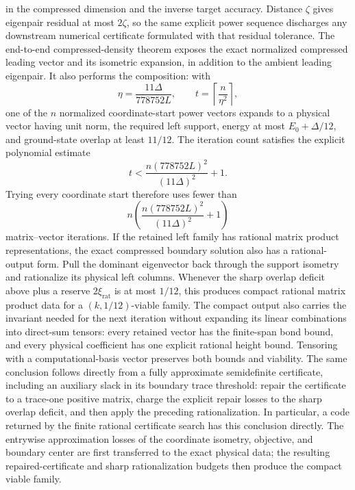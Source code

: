 \begin{lemma}
    in the compressed dimension and the inverse target accuracy.
    Distance \(\zeta\) gives eigenpair residual at most \(2\zeta\), so the
    same explicit power sequence discharges any downstream numerical
    certificate formulated with that residual tolerance.  The end-to-end
    compressed-density theorem exposes the exact normalized compressed
    leading vector and its isometric expansion, in addition to the ambient
    leading eigenpair.  It also performs the composition: with
    \[
        \eta=\frac{11\Delta}{778752L},\qquad
        t=\left\lceil\frac{n}{\eta^2}\right\rceil,
    \]
    one of the \(n\) normalized coordinate-start power vectors expands to a
    physical vector having unit norm, the required left support, energy at
    most \(E_0+\Delta/12\), and ground-state overlap at least \(11/12\).
    The iteration count satisfies the explicit polynomial estimate
    \[
        t<\frac{n(778752L)^2}{(11\Delta)^2}+1.
    \]
    Trying every coordinate start therefore uses fewer than
    \[
        n\left(\frac{n(778752L)^2}{(11\Delta)^2}+1\right)
    \]
    matrix--vector iterations.
    If the retained left family has rational matrix product representations,
    the exact compressed boundary solution also has a rational-output form.
    Pull the dominant eigenvector back through the support isometry and
    rationalize its physical left columns.  Whenever the sharp overlap
    deficit above plus a reserve \(2\xi_{\mathrm{rat}}\) is at most \(1/12\),
    this produces compact rational matrix product data for a
    \((k,1/12)\)-viable family.
    The compact output also carries the invariant needed for the next
    iteration without expanding its linear combinations into direct-sum
    tensors: every retained vector has the finite-span bond bound, and every
    physical coefficient has one explicit rational height bound.  Tensoring
    with a computational-basis vector preserves both bounds and viability.
    The same conclusion follows directly from a fully approximate
    semidefinite certificate, including an auxiliary slack in its boundary
    trace threshold: repair the certificate to a trace-one positive matrix,
    charge the explicit repair losses to the sharp overlap deficit, and then
    apply the preceding rationalization.
    In particular, a code returned by the finite rational certificate search
    has this conclusion directly.  The entrywise approximation losses of the
    coordinate isometry, objective, and boundary center are first transferred
    to the exact physical data; the resulting repaired-certificate and sharp
    rationalization budgets then produce the compact viable family.
\end{lemma}
